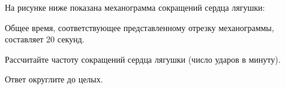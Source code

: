 
На рисунке ниже показана механограмма сокращений сердца лягушки:


Общее время, соответствующее представленному отрезку механограммы, составляет 20 секунд.

Рассчитайте частоту сокращений сердца лягушки (число ударов в минуту).

Ответ округлите до целых.